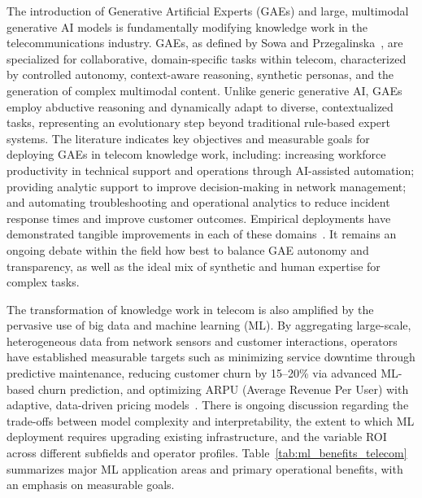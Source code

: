 \documentclass[sigconf]{acmart}
\begin{document}
The introduction of Generative Artificial Experts (GAEs) and large, multimodal generative AI models is fundamentally modifying knowledge work in the telecommunications industry. GAEs, as defined by Sowa and Przegalinska~\cite{ref2}, are specialized for collaborative, domain-specific tasks within telecom, characterized by controlled autonomy, context-aware reasoning, synthetic personas, and the generation of complex multimodal content. Unlike generic generative AI, GAEs employ abductive reasoning and dynamically adapt to diverse, contextualized tasks, representing an evolutionary step beyond traditional rule-based expert systems. The literature indicates key objectives and measurable goals for deploying GAEs in telecom knowledge work, including: increasing workforce productivity in technical support and operations through AI-assisted automation; providing analytic support to improve decision-making in network management; and automating troubleshooting and operational analytics to reduce incident response times and improve customer outcomes. Empirical deployments have demonstrated tangible improvements in each of these domains~\cite{ref2,ref15,ref8,ref18}. It remains an ongoing debate within the field how best to balance GAE autonomy and transparency, as well as the ideal mix of synthetic and human expertise for complex tasks.

The transformation of knowledge work in telecom is also amplified by the pervasive use of big data and machine learning (ML). By aggregating large-scale, heterogeneous data from network sensors and customer interactions, operators have established measurable targets such as minimizing service downtime through predictive maintenance, reducing customer churn by 15--20\% via advanced ML-based churn prediction, and optimizing ARPU (Average Revenue Per User) with adaptive, data-driven pricing models~\cite{ref19,ref29}. There is ongoing discussion regarding the trade-offs between model complexity and interpretability, the extent to which ML deployment requires upgrading existing infrastructure, and the variable ROI across different subfields and operator profiles. Table~\ref{tab:ml_benefits_telecom} summarizes major ML application areas and primary operational benefits, with an emphasis on measurable goals.
\end{document}
